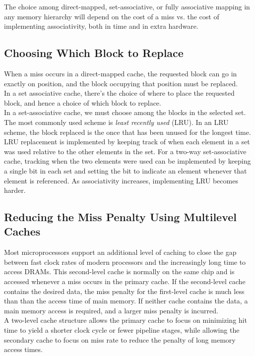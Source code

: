\documentclass[12pt]{article}
\theoremstyle{definition}
\begin{document}
  The choice among direct-mapped, set-associative, or fully associative mapping in any memory hierarchy will depend on the cost of a miss vs. the cost of implementing associativity, both in time and in extra hardware.

  \subsection{Choosing Which Block to Replace}
  When a miss occurs in a direct-mapped cache, the requested block can go in exactly on position, and the block occupying that position must be replaced. \\
  In a set associative cache, there's the choice of where to place the requested block, and hence a choice of which block to replace. \\
  In a set-associative cache, we must choose among the blocks in the selected set. \\

  The most commonly used scheme is \emph{least recently used} (LRU).
  In an LRU scheme, the block replaced is the once that has been unused for the longest time. \\

  LRU replacement is implemented by keeping track of when each element in a set was used relative to the other elements in the set.
  For a two-way set-associative cache, tracking when the two elements were used can be implemented by keeping a single bit in each set and setting the bit to indicate an element whenever that element is referenced.
  As associativity increases, implementing LRU becomes harder.

  \subsection{Reducing the Miss Penalty Using Multilevel Caches}
  Most microprocessors support an additional level of caching to close the gap between fast clock rates of modern processors and the increasingly long time to access DRAMs.
  This second-level cache is normally on the same chip and is accessed whenever a miss occurs in the primary cache.
  If the second-level cache contains the desired data, the miss penalty for the first-level cache is much less than than the access time of main memory.
  If neither cache contains the data, a main memory access is required, and a larger miss penalty is incurred. \\

  A two-level cache structure allows the primary cache to focus on minimizing hit time to yield a shorter clock cycle or fewer pipeline stages, while allowing the secondary cache to focus on miss rate to reduce the penalty of long memory access times. \\
\end{document}
